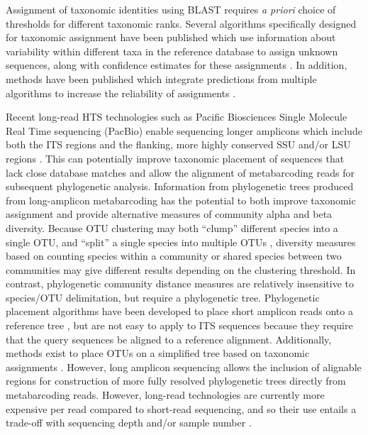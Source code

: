 \documentclass[
  12pt,
]{article}
\begin{document}
Assignment of taxonomic identities using BLAST requires \emph{a priori} choice of thresholds for different taxonomic ranks.
Several algorithms specifically designed for taxonomic assignment have been published which use information about variability within different taxa in the reference database to assign unknown sequences, along with confidence estimates for these assignments \autocites[e.g.,][]{wang2007,edgar2016a,murali2018a}.
In addition, methods have been published which integrate predictions from multiple algorithms to increase the reliability of assignments \autocite{somervuo2016,gdanetz2017}.

Recent long-read HTS technologies such as Pacific Biosciences Single Molecule Real Time sequencing (PacBio) enable sequencing longer amplicons which include both the ITS regions and the flanking, more highly conserved SSU and/or LSU regions \autocite{Tedersoo2018}.
This can potentially improve taxonomic placement of sequences that lack close database matches and allow the alignment of metabarcoding reads for subsequent phylogenetic analysis.
Information from phylogenetic trees produced from long-amplicon metabarcoding has the potential to both improve taxonomic assignment and provide alternative measures of community alpha and beta diversity.
Because OTU clustering may both ``clump'' different species into a single OTU, and ``split'' a single species into multiple OTUs \autocite{ryberg2015}, diversity measures based on counting species within a community or shared species between two communities may give different results depending on the clustering threshold.
In contrast, phylogenetic community distance measures \autocite{wong2016} are relatively insensitive to species/OTU delimitation, but require a phylogenetic tree.
Phylogenetic placement algorithms have been developed to place short amplicon reads onto a reference tree \autocite{matsen2010,berger2011}, but are not easy to apply to ITS sequences because they require that the query sequences be aligned to a reference alignment.
Additionally, methods exist to place OTUs on a simplified tree based on taxonomic assignments \autocite{tedersoo2018}.
However, long amplicon sequencing allows the inclusion of alignable regions for construction of more fully resolved phylogenetic trees directly from metabarcoding reads.
However, long-read technologies are currently more expensive per read compared to short-read sequencing, and so their use entails a trade-off with sequencing depth and/or sample number \autocite{Kennedy2018}.
\end{document}

